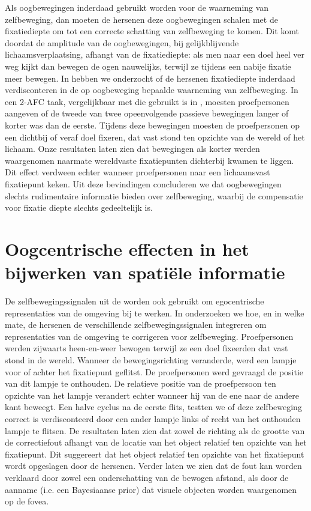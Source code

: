Als oogbewegingen inderdaad gebruikt worden voor de waarneming van zelfbeweging, dan moeten de hersenen deze oogbewegingen schalen met de fixatiediepte om tot een correcte schatting van zelfbeweging te komen. Dit komt doordat de amplitude van de oogbewegingen, bij gelijkblijvende lichaamsverplaatsing, afhangt van de fixatiediepte: als men naar een doel heel ver weg kijkt dan bewegen de ogen nauwelijks, terwijl ze tijdens een nabije fixatie meer bewegen. In  hebben we onderzocht of de hersenen fixatiediepte inderdaad verdisconteren in de op oogbeweging bepaalde waarneming van zelfbeweging. In een 2-AFC taak, vergelijkbaar met die gebruikt is in , moesten proefpersonen aangeven of de tweede van twee opeenvolgende passieve bewegingen langer of korter was dan de eerste. Tijdens deze bewegingen moesten de proefpersonen op een dichtbij of veraf doel fixeren, dat vast stond ten opzichte van de wereld of het lichaam. Onze resultaten laten zien dat bewegingen als korter werden waargenomen naarmate wereldvaste fixatiepunten dichterbij kwamen te liggen. Dit effect verdween echter wanneer proefpersonen naar een lichaamsvast fixatiepunt keken. Uit deze bevindingen concluderen we dat oogbewegingen slechts rudimentaire informatie bieden over zelfbeweging, waarbij de compensatie voor fixatie diepte slechts gedeeltelijk is.


\section{Oogcentrische effecten in het bijwerken van spati\"ele informatie}

De zelfbewegingssignalen uit de  worden ook gebruikt om egocentrische representaties van de omgeving bij te werken. In  onderzoeken we hoe, en in welke mate, de hersenen de verschillende zelfbewegingssignalen integreren om representaties van de omgeving te corrigeren voor zelfbeweging. Proefpersonen werden zijwaarts heen-en-weer bewogen terwijl ze een doel fixeerden dat vast stond in de wereld. Wanneer de bewegingsrichting veranderde, werd een lampje voor of achter het fixatiepunt geflitst. De proefpersonen werd gevraagd de positie van dit lampje te onthouden. De relatieve positie van de proefpersoon ten opzichte van het lampje verandert echter wanneer hij van de ene naar de andere kant beweegt. Een halve cyclus na de eerste flits, testten we of deze zelfbeweging correct is verdisconteerd door een ander lampje links of recht van het onthouden lampje te flitsen. De resultaten laten zien dat zowel de richting als de grootte van de correctiefout afhangt van de locatie van het object relatief ten opzichte van het fixatiepunt. Dit suggereert dat het object relatief ten opzichte van het fixatiepunt wordt opgeslagen door de hersenen. Verder laten we zien dat de fout kan worden verklaard door zowel een onderschatting van de bewogen afstand, als door de aanname (i.e. een Bayesiaanse prior) dat visuele objecten worden waargenomen op de fovea.


